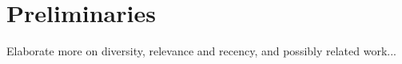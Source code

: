 \section{Preliminaries}
Elaborate more on diversity, relevance and recency, and possibly related work...